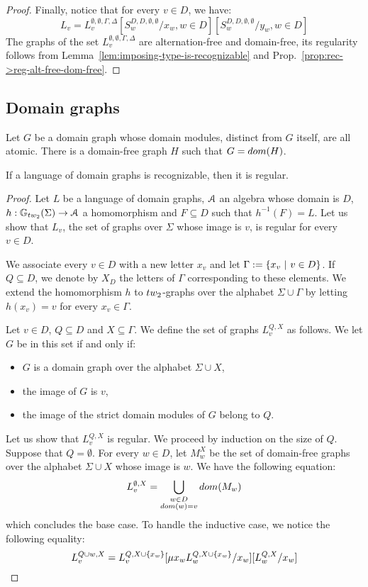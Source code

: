 \begin{proof}
\noindent Finally, notice that for every $v\in D$, we have:
$$ L_v=L^{\emptyset,\emptyset,\Gamma,\Delta}_v[S^{D,D,\emptyset,\emptyset}_w/x_w, w\in D] [S^{D,D,\emptyset,\emptyset}_w/y_w, w\in D]$$
The graphs of the set $L^{\emptyset,\emptyset,\Gamma,\Delta}_v$ are alternation-free and domain-free, its regularity follows from Lemma~\ref{lem:imposing-type-is-recognizable} and Prop.~\ref{prop:rec->reg-alt-free-dom-free}.
\end{proof}

\subsection{Domain graphs}

\begin{lemma}
Let $G$ be a domain graph whose domain modules, distinct from $G$ itself, are all atomic. There is a domain-free graph $H$ such that $G=\dom(H)$.   
\end{lemma}

\begin{proposition}
If a language of domain graphs is recognizable, then it is regular.
\end{proposition}
\begin{proof}
Let $L$ be a language of domain graphs, $\mathcal A$ an algebra whose domain is $D$, $h:\mathbb{G}_\TWT(\Sigma) \to \A$ a homomorphism and $F\subseteq D$ such that $h^{-1}(F)=L$. Let us show that $L_v$, the set of graphs over $\Sigma$ whose image  is $v$,  is regular for every $v\in D$. 
\medskip

We associate every $v\in D$ with a new letter $x_v$ and let  $\Gamma:=\left\{x_v\ | \ v\in D\right\}$. If $Q\subseteq D$, we denote by $X_D$ the letters of $\Gamma$ corresponding to these elements.   We extend the homomorphism $h$ to $\TWT$-graphs over the alphabet $\Sigma \cup \Gamma$ by letting $h(x_v)=v$ for every $x_v\in\Gamma$. 
\medskip

Let $v\in D$, $Q\subseteq D$ and $X\subseteq \Gamma$.  We define the set of graphs $L^{Q,X}_{v}$ as follows. We let $G$ be in this set  if and only if:
\begin{itemize}
\item $G$ is a domain graph over the alphabet $\Sigma\cup X$, 
\item the image of $G$ is $v$,
\item  the image of the strict domain modules of $G$ belong to $Q$.
\end{itemize}
\medskip

\noindent Let us show that $L^{Q,X}_v$ is regular. We proceed by induction on the size of $Q$. Suppose that $Q=\emptyset$. For every $w\in D$, let $M^X_w$ be the set of domain-free graphs over the alphabet $\Sigma\cup X$ whose image is $w$.  
 We have the following equation:
$$ L^{\emptyset, X}_v= \bigcup_{\substack{w\in D\\ \dom(w)=v}}\dom(M_w)$$
 which concludes the base case. To handle the inductive case, we notice the following equality:
 $$L^{Q\cup{w}, X}_v= L^{Q, X\cup\left\{x_w\right\}}_v[\mu x_w L^{Q, X\cup\left\{x_w\right\}}_w/x_w][L^{Q, X}_w/x_w]$$
\end{proof}

